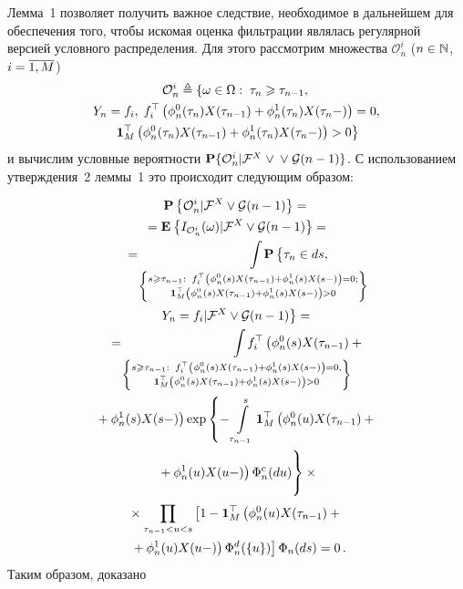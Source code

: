 \begin{multicols}{2}
\smallskip
 Лемма~1 позволяет получить важное следствие, необходимое в дальнейшем для
 обеспечения того, чтобы искомая оценка фильтрации являлась регулярной
 версией условного распределения. Для этого рассмотрим множества $\mathcal{O}_n^i$
 ($n \hm\in \mathbb{N}$, $i\hm=\overline{1,M}$)
 \begin{multline*}
 \mathcal{O}_n^i \triangleq \left\{ \omega \in \Omega: \; \tau_n
 \geqslant \tau_{n-1}, \right.\\
\left. Y_n= f_i, \;
 f_i^{\top}\left(\phi^0_{n}(\tau_{n})X(\tau_{n-1})+\phi^1_{n}(\tau_{n})X(\tau_{n}-)
 \right)=0,
 \right.\hspace*{-0.79958pt}
 \\
 \left.
 \mathbf{1}_M^{\top}\left(\phi^0_{n}(\tau_{n})X(\tau_{n-1})+\phi^1_{n}(\tau_{n})X(\tau_{n}-)
 \right)>0\right \}
 \end{multline*}
 и вычислим условные вероятности $\mathbf{P}\{\mathcal{O}_n^i|{\mathcal F}^X \;\vee$\linebreak
 $\vee\; {\mathcal G}(n-1)\}$. С использованием утверждения~2 леммы~1
 это происходит следующим образом:

 \noindent
 \begin{multline*}
 \pp{\mathcal{O}_n^i|\ff^X \vee \G(n-1)} = {}\\
 {}=
 \me{}{I_{\mathcal{O}_n^i}(\omega)|\ff^X \vee \G(n-1)}={} \\
 \hspace*{-5mm}{}=
\int\limits_{\left\{
 \substack{{s \geqslant \tau_{n-1}: \;\;
  f_i^{\top}\left(\phi^0_{n}(s)X(\tau_{n-1})+\phi^1_{n}(s)X(s-)
 \right)=0;}\\
{ \mathbf{1}_M^{\top}\left(\phi^0_{n}(s)X(\tau_{n-1})+\phi^1_{n}(s)X(s-)
 \right)>0}}
 \right\} }\hspace*{-30mm}\mathbf{P}\left\{
 \vphantom{\ff^X}
 \tau_n \in ds,\right.\\
 \left. Y_n=f_i|\ff^X \vee \G(n-1)\right\}={}\\
{}= \int\limits_{\left\{
\substack{{s \geqslant \tau_{n-1}: \;\;
 f_i^{\top}\left(\phi^0_{n}(s)X(\tau_{n-1})+\phi^1_{n}(s)X(s-)
 \right)=0,} \\
{ \mathbf{1}_M^{\top}\left(\phi^0_{n}(s)X(\tau_{n-1})+\phi^1_{n}(s)X(s-)
 \right)>0}}\right\}} \hspace*{-30mm} f_i^{\top}\left(
 \phi^0_{n}(s)X(\tau_{n-1})+{}\right.\\
\left. {}+\phi^1_{n}(s)X(s-)
 \right)  \exp \left\{
 -\int\limits_{\tau_{n-1}}^s \mathbf{1}_M^{\top}\left(
 \phi^0_n(u)X(\tau_{n-1})+{}\right.\right.\\
\left.\left. {}+\phi^1_n(u)X(u-)
 \right)\Phi^c_n(du)
 \vphantom{\int\limits_{\tau_{n-1}}^s}
 \right\} \times {}\\
{} \times \prod\limits_{\tau_{n-1} < u < s}\left[
 1-
 \mathbf{1}_M^{\top}\left(
 \phi^0_n(u)X(\tau_{n-1})+{}\right.\right.\\
\left.\left. {}+\phi^1_n(u)X(u-)
 \right)\Phi^d_n(\{u\})
 \right]
 \Phi_{n}(ds) =0\,.
  \end{multline*}
 Таким образом, доказано


\end{multicols}
